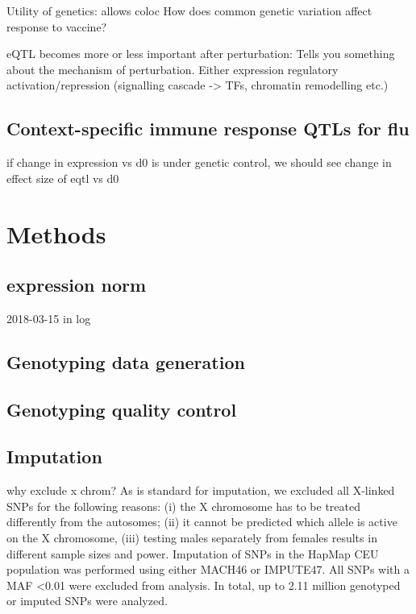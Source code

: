 Utility of genetics:
allows coloc
How does common genetic variation affect response to vaccine?

eQTL becomes more or less important after perturbation: Tells you something about the mechanism of perturbation.
Either expression regulatory activation/repression (signalling cascade -> TFs, chromatin remodelling etc.)

\subsection{Context-specific immune response QTLs for flu}

if change in expression vs d0 is under genetic control, we should see change in effect size of eqtl vs d0

\section{Methods}

\subsection{expression norm}
2018-03-15 in log

\subsection{Genotyping data generation}

\subsection{Genotyping quality control}

\subsection{Imputation}

why exclude x chrom?
As is standard for imputation, we excluded all X-linked SNPs for the following reasons: (i) the X chromosome has to be treated differently from the autosomes; (ii) it cannot be predicted which allele is active on the X chromosome, (iii) testing males separately from females results in different sample sizes and power. Imputation of SNPs in the HapMap CEU population was performed using either MACH46 or IMPUTE47. All SNPs with a MAF <0.01 were excluded from analysis. In total, up to 2.11 million genotyped or imputed SNPs were analyzed.

